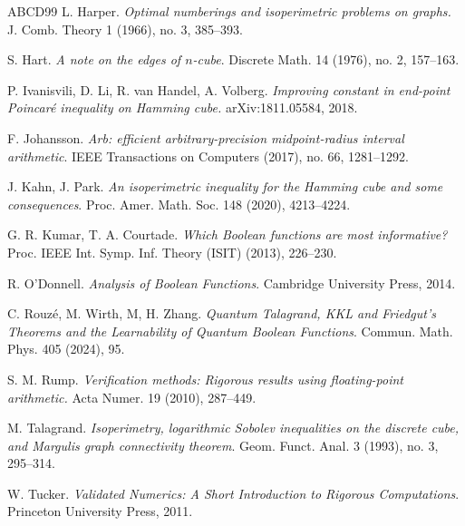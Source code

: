 \documentclass[11pt]{amsart}
\theoremstyle{plain}
\theoremstyle{definition}
\theoremstyle{remark}
\numberwithin{equation}{section}
\begin{document}
\begin{thebibliography}{ABCD99}
 L. Harper. {\em Optimal numberings and isoperimetric problems on graphs.} J. Comb. Theory 1 (1966), no. 3, 385--393.

 S. Hart. {\em A note on the edges of $n$-cube}. Discrete Math. 14 (1976), no. 2, 157--163.

P. Ivanisvili, D. Li, R. van Handel, A. Volberg.
{\em Improving constant in end-point Poincaré inequality on Hamming cube.} arXiv:1811.05584, 2018.

 F. Johansson. {\em Arb: efficient arbitrary-precision midpoint-radius interval arithmetic}. IEEE Transactions on Computers (2017), no. 66, 1281--1292.

J. Kahn, J. Park. {\em An isoperimetric inequality for the Hamming cube and some consequences}. Proc. Amer. Math. Soc. 148 (2020), 4213--4224.

G. R. Kumar, T. A. Courtade. {\em Which Boolean functions are most informative?} Proc. IEEE Int. Symp. Inf. Theory (ISIT) (2013), 226--230.

 R. O'Donnell. {\em Analysis of Boolean Functions}. Cambridge University Press, 2014.

 C. Rouz\'e, M. Wirth, M, H. Zhang. {\em Quantum Talagrand, KKL and Friedgut’s Theorems and the Learnability of Quantum Boolean Functions}. Commun. Math. Phys. 405 (2024), 95.

 S. M. Rump. {\em Verification methods: Rigorous results using floating-point arithmetic.} Acta Numer. 19 (2010), 287--449.

 M. Talagrand. {\em Isoperimetry, logarithmic Sobolev inequalities on the discrete cube, and
Margulis graph connectivity theorem}. Geom. Funct. Anal. 3 (1993), no. 3, 295--314.

 W. Tucker. {\em Validated Numerics: A Short Introduction to Rigorous Computations}. Princeton University Press, 2011.

\end{thebibliography}
\end{document}
